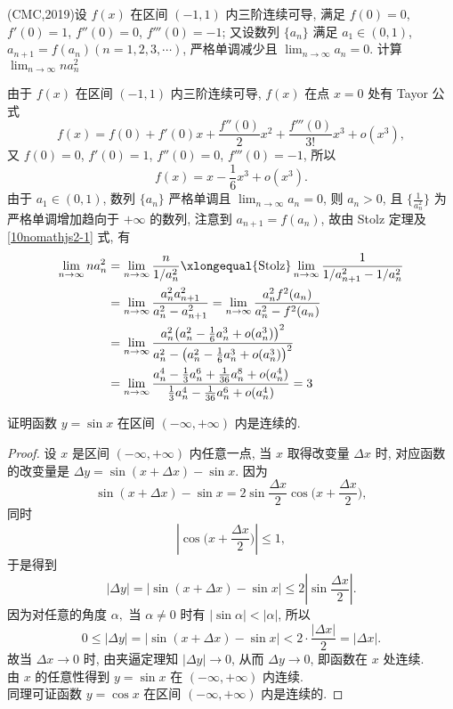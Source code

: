 \documentclass[color=green,titlestyle=hang]{elegantbook}%
\begin{document}
\begin{example}
(CMC,2019)设 $f(x)$ 在区间 $(-1,1)$ 内三阶连续可导, 满足 $f(0)=0$, $f'(0)=1$, $f''(0)=0$, $f'''(0)=-1$; 又设数列 $\{a_n\}$ 满足 $a_1\in(0,1)$, $a_{n+1}=f(a_n)(n=1,2,3,\cdots)$, 严格单调减少且 $\lim_{n\to\infty}a_n=0$. 计算 $\lim_{n\to\infty}na_n^2$
\end{example}\begin{solution}
由于 $f(x)$ 在区间 $(-1,1)$ 内三阶连续可导, $f(x)$ 在点 $x=0$ 处有 Tayor 公式
\[f(x)=f(0)+f'(0)x+\frac{f''(0)}{2}x^2+\frac{f'''(0)}{3!}x^3+o(x^3),\]
又 $f(0)=0$, $f'(0)=1$, $f''(0)=0$, $f'''(0)=-1$, 所以
\begin{equation}\label{10nomathjs2-1}
f(x)=x-\frac{1}{6}x^3+o(x^3).
\end{equation}
由于 $a_1\in(0,1)$, 数列 $\{a_n\}$ 严格单调且 $\lim_{n\to\infty}a_n=0$, 则 $a_n>0$, 且 $\bigg\{\frac{1}{a_n^2}\bigg\}$ 为严格单调增加趋向于 $+\infty$ 的数列, 注意到 $a_{n+1}=f(a_n)$, 故由 Stolz 定理及  \eqref{10nomathjs2-1} 式, 有
\begin{align*}
\lim_{n\to\infty}na_n^2
&=\lim_{n\to\infty}\frac{n}{1/a_n^2}\xlongequal{\text{Stolz}}\lim_{n\to\infty}\frac{1}{1/a_{n+1}^2-1/a_n^2}\\
&=\lim_{n\to\infty}\frac{a_n^2a_{n+1}^2}{a_n^2-a_{n+1}^2}=\lim_{n\to\infty}\frac{a_n^2f^2(a_n)}{a_n^2-f^2(a_n)}\\
&=\lim_{n\to\infty}\frac{a_n^2\big(a_n^2-\frac{1}{6}a_n^3+o(a_n^3)\big)^2}{a_n^2-\big(a_n^2-\frac{1}{6}a_n^3+o(a_n^3)\big)^2}\\
&=\lim_{n\to\infty}\frac{a_n^4-\frac{1}{3}a_n^6+\frac{1}{36}a_n^8+o(a_n^4)}{\frac{1}{3}a_n^4-\frac{1}{36}a_n^6+o(a_n^4)}=3
\end{align*}
\end{solution}

\begin{example}
证明函数 $y=\sin x$ 在区间 $(-\infty,+\infty)$ 内是连续的.	
\end{example}\begin{proof}
设 $x$ 是区间 $(-\infty,+\infty)$ 内任意一点, 当 $x$ 取得改变量 $\Delta x$ 时, 对应函数的改变量是
$\Delta y=\sin(x+\Delta x)-\sin x.$
因为
$$\sin(x+\Delta x)-\sin x=2\sin\frac{\Delta x}{2}\cos\Big (x+\frac{\Delta x}{2}\Big),$$
同时
$$\left|\cos\Big (x+\frac{\Delta x}{2}\Big)\right|\leqslant 1,$$
于是得到
$$|\Delta y|=|\sin(x+\Delta x)-\sin x|\leqslant 2\left|\sin\frac{\Delta x}{2}\right|.$$
因为对任意的角度 $\alpha,$ 当 $\alpha\ne 0$ 时有 $|\sin \alpha|<|\alpha|$, 所以
$$0\leqslant |\Delta y|=|\sin(x+\Delta x)-\sin x|<2\cdot \frac{|\Delta x|}{2}=|\Delta x|.$$
故当 $\Delta x\to 0$ 时, 由夹逼定理知 $|\Delta y|\to 0$, 从而  $\Delta y\to 0$, 即函数在 $x$ 处连续. \\
由 $x$ 的任意性得到 $y=\sin x$ 在 $(-\infty,+\infty)$ 内连续.\\
同理可证函数 $y=\cos x$ 在区间 $(-\infty,+\infty)$ 内是连续的.	
\end{proof}
\end{document}
